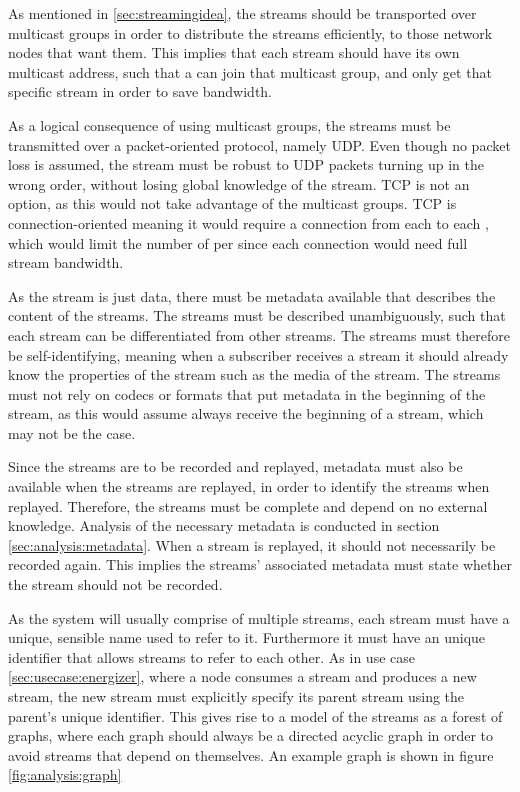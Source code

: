 As mentioned in \ref{sec:streamingidea}, the streams should be transported over multicast groups in order to distribute the streams efficiently, to those network nodes that want them.  This implies that each stream should have its own multicast address, such that a  can join that multicast group, and only get that specific stream in order to save bandwidth.

As a logical consequence of using multicast groups, the streams must be transmitted over a  packet-oriented protocol, namely UDP. Even though no packet loss is assumed, the stream must be robust to UDP packets turning up in the wrong order, without losing global knowledge of the stream. TCP is not an option, as this would not take advantage of the multicast groups. TCP is connection-oriented meaning it would require a connection from each  to each , which would limit the number of  per  since each connection would need full stream bandwidth.

As the stream is just data, there must be metadata available that describes the content of the streams. The streams must be described unambiguously, such that each stream can be differentiated from other streams. The streams must therefore be self-identifying, meaning when a subscriber receives a stream it should already know the properties of the stream such as the media of the stream. The streams must not rely on codecs or formats that put metadata in the beginning of the stream, as this would assume  always receive the beginning of a stream, which may not be the case.

Since the streams are to be recorded and replayed, metadata must also be available when the streams are replayed, in order to identify the streams when replayed. Therefore, the streams must be complete and depend on no external knowledge. Analysis of the necessary metadata is conducted in section \ref{sec:analysis:metadata}. When a stream is replayed, it should not necessarily be recorded again. This implies the streams' associated metadata must state whether the stream should not be recorded.

As the system will usually comprise of multiple streams, each stream must have a unique, sensible name used to refer to it. Furthermore it must have an unique identifier that allows streams to refer to each other.
As in use case \ref{sec:usecase:energizer}, where a node consumes a stream and produces a new stream, the new stream must explicitly specify its parent stream using the parent's unique identifier. This gives rise to a model of the streams as a forest of graphs, where each graph should always be a directed acyclic graph in order to avoid streams that depend on themselves. An example graph is shown in figure \ref{fig:analysis:graph}

